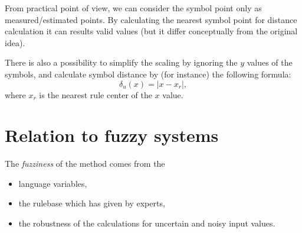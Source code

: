 \documentclass[a4paper,12pt]{article}
\begin{document}
From practical point of view, we can consider the symbol point only as measured/estimated points. By calculating the nearest symbol point for distance calculation it can results valid values (but it differ conceptually from the original idea).

There is also a possibility to simplify the scaling by ignoring the $y$ values of the symbols, and calculate symbol distance by (for instance) the following formula:
\[
\delta_u(x) = |x - x_r|,
\]
where $x_r$ is the nearest rule center of the $x$ value.

\section{Relation to fuzzy systems}

The \textit{fuzziness} of the method comes from the
\begin{itemize}
    \item language variables,
    \item the rulebase which has given by experts,
    \item the robustness of the calculations for uncertain and noisy input values.
\end{itemize}
\end{document}
